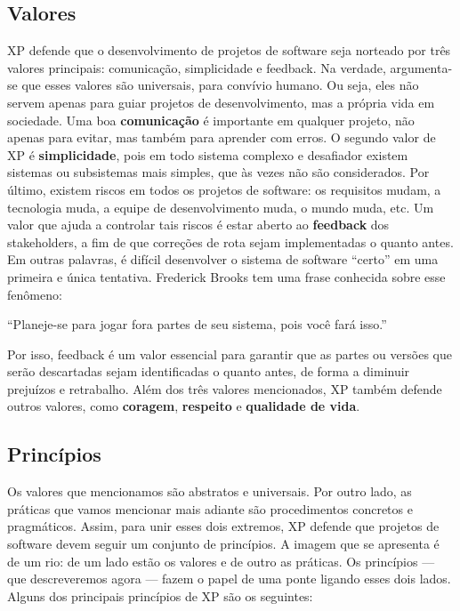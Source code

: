 \documentclass[
  11pt,
  twoside]{book}
\renewenvironment{quote}{\centering \vspace{1.5ex} \begin{tcolorbox}[colback=backcolor, width=4.9in]}{\end{tcolorbox}}
\begin{document}
\hypertarget{valores}{%
\subsection{Valores}\label{valores}}

 XP defende que o desenvolvimento de
projetos de software seja norteado por três valores principais:
comunicação, simplicidade e feedback. Na verdade, argumenta-se que esses
valores são universais, para convívio humano. Ou seja, eles não servem
apenas para guiar projetos de desenvolvimento, mas a própria vida em
sociedade. Uma boa \textbf{comunicação} é importante em qualquer
projeto, não apenas para evitar, mas também para aprender com erros. O
segundo valor de XP é \textbf{simplicidade}, pois em todo sistema
complexo e desafiador existem sistemas ou subsistemas mais simples, que
às vezes não são considerados. Por último, existem riscos em todos os
projetos de software: os requisitos mudam, a tecnologia muda, a equipe
de desenvolvimento muda, o mundo muda, etc. Um valor que ajuda a
controlar tais riscos é estar aberto ao \textbf{feedback} dos
stakeholders, a fim de que correções de rota sejam implementadas o
quanto antes. Em outras palavras, é difícil desenvolver o sistema de
software ``certo'' em uma primeira e única tentativa. Frederick Brooks
tem uma frase conhecida sobre esse fenômeno:

\begin{quote}
``Planeje-se para jogar fora partes de seu sistema, pois você fará
isso.''
\end{quote}

Por isso, feedback é um valor essencial para garantir que as partes ou
versões que serão descartadas sejam identificadas o quanto antes, de
forma a diminuir prejuízos e retrabalho. Além dos três valores
mencionados, XP também defende outros valores, como \textbf{coragem},
\textbf{respeito} e \textbf{qualidade de vida}.

\hypertarget{princuxedpios}{%
\subsection{Princípios}\label{princuxedpios}}

 Os valores que mencionamos são
abstratos e universais. Por outro lado, as práticas que vamos mencionar
mais adiante são procedimentos concretos e pragmáticos. Assim, para unir
esses dois extremos, XP defende que projetos de software devem seguir um
conjunto de princípios. A imagem que se apresenta é de um rio: de um
lado estão os valores e de outro as práticas. Os princípios --- que
descreveremos agora --- fazem o papel de uma ponte ligando esses dois
lados. Alguns dos principais princípios de XP são os seguintes:
\end{document}
